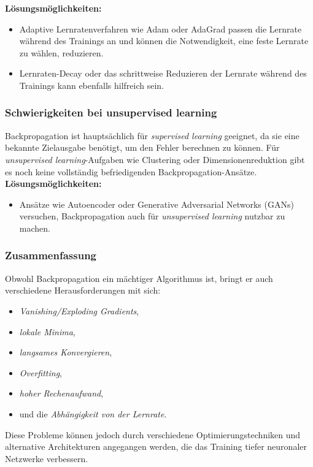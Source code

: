 \documentclass[12pt]{article}
\begin{document}
\textbf{Lösungsmöglichkeiten:}
\begin{itemize}
    \item Adaptive Lernratenverfahren wie Adam oder AdaGrad passen die Lernrate während des Trainings an und können die Notwendigkeit, eine feste Lernrate zu wählen, reduzieren.
    \item Lernraten-Decay oder das schrittweise Reduzieren der Lernrate während des Trainings kann ebenfalls hilfreich sein.
\end{itemize}
%
\subsubsection{Schwierigkeiten bei unsupervised learning}

Backpropagation ist hauptsächlich für \textit{supervised learning} geeignet, da sie eine bekannte Zielausgabe benötigt, um den Fehler berechnen zu können. Für \textit{unsupervised learning}-Aufgaben wie Clustering oder Dimensionenreduktion gibt es noch keine vollständig befriedigenden Backpropagation-Ansätze.\\

\textbf{Lösungsmöglichkeiten:}
\begin{itemize}
    \item Ansätze wie Autoencoder oder Generative Adversarial Networks (GANs) versuchen, Backpropagation auch für \textit{unsupervised learning} nutzbar zu machen.
\end{itemize}

\subsubsection*{Zusammenfassung}

Obwohl Backpropagation ein mächtiger Algorithmus ist, bringt er auch verschiedene Herausforderungen mit sich:
\begin{itemize}
    \item \textit{Vanishing/Exploding Gradients},
    \item \textit{lokale Minima},
    \item \textit{langsames Konvergieren},
    \item \textit{Overfitting},
    \item \textit{hoher Rechenaufwand},
    \item und die \textit{Abhängigkeit von der Lernrate}.
\end{itemize}
%
Diese Probleme können jedoch durch verschiedene Optimierungstechniken und alternative Architekturen angegangen werden, die das Training tiefer neuronaler Netzwerke verbessern.
 
\end{document}
